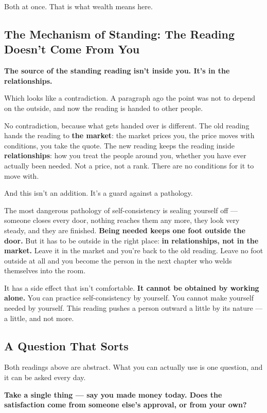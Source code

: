 \documentclass[11pt,a4paper]{article}
\begin{document}
Both at once. That is what wealth means here.

\subsection{The Mechanism of Standing: The Reading Doesn't Come From You}

\textbf{The source of the standing reading isn't inside you. It's in the relationships.}

Which looks like a contradiction. A paragraph ago the point was not to depend on the outside, and now the reading is handed to other people.

No contradiction, because what gets handed over is different. The old reading hands the reading to \textbf{the market}: the market prices you, the price moves with conditions, you take the quote. The new reading keeps the reading inside \textbf{relationships}: how you treat the people around you, whether you have ever actually been needed. Not a price, not a rank. There are no conditions for it to move with.

And this isn't an addition. It's a guard against a pathology.

The most dangerous pathology of self-consistency is sealing yourself off --- someone closes every door, nothing reaches them any more, they look very steady, and they are finished. \textbf{Being needed keeps one foot outside the door.} But it has to be outside in the right place: \textbf{in relationships, not in the market.} Leave it in the market and you're back to the old reading. Leave no foot outside at all and you become the person in the next chapter who welds themselves into the room.

It has a side effect that isn't comfortable. \textbf{It cannot be obtained by working alone.} You can practice self-consistency by yourself. You cannot make yourself needed by yourself. This reading pushes a person outward a little by its nature --- a little, and not more.

\subsection{A Question That Sorts}

Both readings above are abstract. What you can actually use is one question, and it can be asked every day.

\textbf{Take a single thing --- say you made money today. Does the satisfaction come from someone else's approval, or from your own?}
\end{document}
